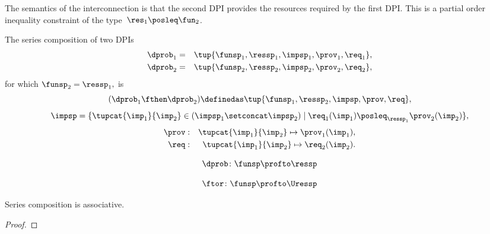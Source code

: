 The semantics of the interconnection is that the second DPI provides the resources required by the first DPI.
This is a partial order inequality constraint of the type~$\res_{1}\posleq\fun_{2}$.


\begin{definition}
  \label{def:series-composition}The series composition of two DPIs
  \begin{equation}
    \begin{aligned}
    \dprob_{1}&=&\tup{\funsp_{1},\ressp_{1},\impsp_{1},\prov_{1},\req_{1}},
  \\
    \dprob_{2}&=&\tup{\funsp_{2},\ressp_{2},\impsp_{2},\prov_{2},\req_{2}},
  \end{aligned}
  \end{equation}
  for which $\funsp_{2}=\ressp_{1},$ is
  \begin{equation}
    (\dprob_{1} \fthen \dprob_{2})
    \definedas
    \tup{ \funsp_{1},\ressp_{2},\impsp,\prov,\req},
  \end{equation}
  \begin{equation}
    \impsp  =  \{  \tupcat {\imp_{1}} {\imp_{2}} \in (\impsp_{1} \setconcat \impsp_{2})\mid\req_{1}(\imp_{1})\posleq_{\ressp_{1}}\prov_{2}(\imp_{2})\},
  \end{equation}
  \begin{equation}
  \begin{aligned}
    \prov & : & \tupcat {\imp_{1}} {\imp_{2}}   \mapsto\prov_{1}(\imp_{1}),\\
    \req & : & \tupcat {\imp_{1}} {\imp_{2}} \mapsto\req_{2}(\imp_{2}).
  \end{aligned}
  \end{equation}
\end{definition}

\begin{forslides}
\begin{equation}\label{eq:dproba}
  \dprob \colon \funsp \profto \ressp
\end{equation}

\begin{equation}\label{eq:dprob2}
  \ftor \colon \funsp \profto \Uressp
\end{equation}
\end{forslides}

\begin{lemma}
  Series composition is associative.
\end{lemma}
\begin{proof}
\end{proof}

